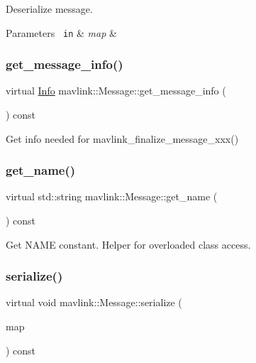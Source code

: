 Deserialize message.


\begin{DoxyParams}[1]{Parameters}
\mbox{\texttt{ in}}  & {\em map} & \\
\hline
\end{DoxyParams}
\mbox{\label{structmavlink_1_1Message_abf1ca05ae7564100d52b04473a784d1c}} 
\subsubsection{\texorpdfstring{get\_message\_info()}{get\_message\_info()}}
{\footnotesize\ttfamily virtual \mbox{\hyperlink{structmavlink_1_1Message_1_1Info}{Info}} mavlink\+::\+Message\+::get\+\_\+message\+\_\+info (\begin{DoxyParamCaption}\item[{void}]{ }\end{DoxyParamCaption}) const\hspace{0.3cm}{\ttfamily [pure virtual]}}

Get info needed for mavlink\+\_\+finalize\+\_\+message\+\_\+xxx() \mbox{\label{structmavlink_1_1Message_acfcd821ce25f7e4e2633f44d4a57b185}} 
\subsubsection{\texorpdfstring{get\_name()}{get\_name()}}
{\footnotesize\ttfamily virtual std\+::string mavlink\+::\+Message\+::get\+\_\+name (\begin{DoxyParamCaption}\item[{void}]{ }\end{DoxyParamCaption}) const\hspace{0.3cm}{\ttfamily [pure virtual]}}

Get N\+A\+ME constant. Helper for overloaded class access. \mbox{\label{structmavlink_1_1Message_a8aebc1882e5e4b7838909b5fdd56ef1d}} 
\subsubsection{\texorpdfstring{serialize()}{serialize()}}
{\footnotesize\ttfamily virtual void mavlink\+::\+Message\+::serialize (\begin{DoxyParamCaption}\item[{\mbox{\hyperlink{classmavlink_1_1MsgMap}{Msg\+Map}} \&}]{map }\end{DoxyParamCaption}) const\hspace{0.3cm}{\ttfamily [pure virtual]}}

